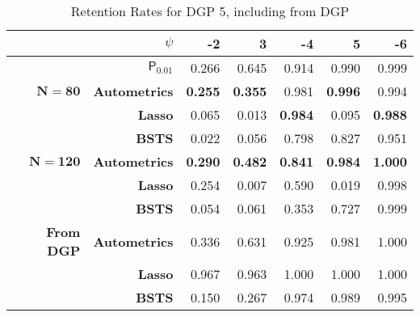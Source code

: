 \begin{table}[htbp]
  \centering

    \begin{tabular}{r|r|rrrrr}

          & \boldmath{}\textbf{$\psi$}\unboldmath{} & -2    & 3     & -4    & 5     & -6 \\
          \hline

        & $\mathsf{P}_{0.01}$ & 0.266 & 0.645 & 0.914 & 0.990 & 0.999  \\
        \hline
    $\bm{N=80} $& \textbf{Autometrics} & \textbf{0.255} & \textbf{0.355} & 0.981 & \textbf{0.996} & 0.994 \\
    \textbf{} & \textbf{Lasso} & 0.065 & 0.013 & \textbf{0.984} & 0.095 & \textbf{0.988} \\
    \textbf{} & \textbf{BSTS} & 0.022 & 0.056 & 0.798 & 0.827 & 0.951 \\
    \hline
    $\bm{N=120}$ & \textbf{Autometrics} & \textbf{0.290} & \textbf{0.482} & \textbf{0.841} & \textbf{0.984} & \textbf{1.000} \\
    \textbf{} & \textbf{Lasso} & 0.254 & 0.007 & 0.590 & 0.019 & 0.998 \\
    \textbf{} & \textbf{BSTS} & 0.054 & 0.061 & 0.353 & 0.727 & 0.999 \\
    \hline
    \textbf{From DGP} & \textbf{Autometrics} & 0.336 & 0.631 & 0.925 & 0.981 & 1.000 \\
          & \textbf{Lasso} & 0.967 & 0.963 & 1.000 & 1.000 & 1.000 \\
          & \textbf{BSTS} & 0.150 & 0.267 & 0.974 & 0.989 & 0.995 \\
 
    \end{tabular}%
      \caption{Retention Rates for DGP 5, including from DGP}
  \label{DGP5RetRates}%
\end{table}%



